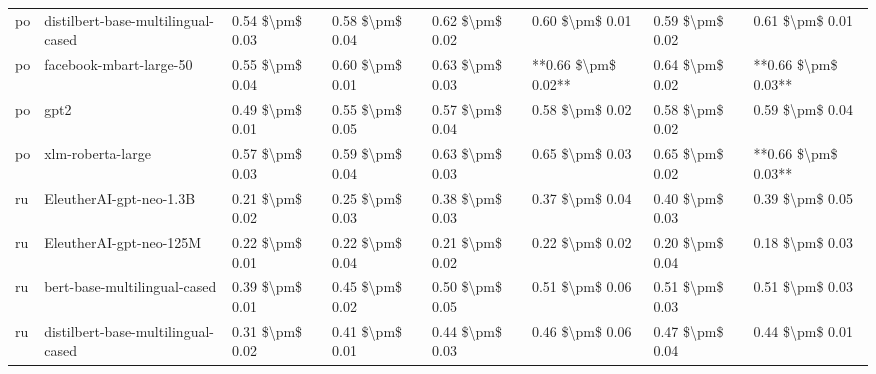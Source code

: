 \begin{tabular}{llllllll}
      po & distilbert-base-multilingual-cased & 0.54 \$\textbackslash pm\$ 0.03 &           0.58 \$\textbackslash pm\$ 0.04 &       0.62 \$\textbackslash pm\$ 0.02 &        0.60 \$\textbackslash pm\$ 0.01 &                         0.59 \$\textbackslash pm\$ 0.02 &     0.61 \$\textbackslash pm\$ 0.01 \\
      po &            facebook-mbart-large-50 & 0.55 \$\textbackslash pm\$ 0.04 &           0.60 \$\textbackslash pm\$ 0.01 &       0.63 \$\textbackslash pm\$ 0.03 &    **0.66 \$\textbackslash pm\$ 0.02** &                         0.64 \$\textbackslash pm\$ 0.02 & **0.66 \$\textbackslash pm\$ 0.03** \\
      po &                               gpt2 & 0.49 \$\textbackslash pm\$ 0.01 &           0.55 \$\textbackslash pm\$ 0.05 &       0.57 \$\textbackslash pm\$ 0.04 &        0.58 \$\textbackslash pm\$ 0.02 &                         0.58 \$\textbackslash pm\$ 0.02 &     0.59 \$\textbackslash pm\$ 0.04 \\
      po &                  xlm-roberta-large & 0.57 \$\textbackslash pm\$ 0.03 &           0.59 \$\textbackslash pm\$ 0.04 &       0.63 \$\textbackslash pm\$ 0.03 &        0.65 \$\textbackslash pm\$ 0.03 &                         0.65 \$\textbackslash pm\$ 0.02 & **0.66 \$\textbackslash pm\$ 0.03** \\
      ru &            EleutherAI-gpt-neo-1.3B & 0.21 \$\textbackslash pm\$ 0.02 &           0.25 \$\textbackslash pm\$ 0.03 &       0.38 \$\textbackslash pm\$ 0.03 &        0.37 \$\textbackslash pm\$ 0.04 &                         0.40 \$\textbackslash pm\$ 0.03 &     0.39 \$\textbackslash pm\$ 0.05 \\
      ru &            EleutherAI-gpt-neo-125M & 0.22 \$\textbackslash pm\$ 0.01 &           0.22 \$\textbackslash pm\$ 0.04 &       0.21 \$\textbackslash pm\$ 0.02 &        0.22 \$\textbackslash pm\$ 0.02 &                         0.20 \$\textbackslash pm\$ 0.04 &     0.18 \$\textbackslash pm\$ 0.03 \\
      ru &       bert-base-multilingual-cased & 0.39 \$\textbackslash pm\$ 0.01 &           0.45 \$\textbackslash pm\$ 0.02 &       0.50 \$\textbackslash pm\$ 0.05 &        0.51 \$\textbackslash pm\$ 0.06 &                         0.51 \$\textbackslash pm\$ 0.03 &     0.51 \$\textbackslash pm\$ 0.03 \\
      ru & distilbert-base-multilingual-cased & 0.31 \$\textbackslash pm\$ 0.02 &           0.41 \$\textbackslash pm\$ 0.01 &       0.44 \$\textbackslash pm\$ 0.03 &        0.46 \$\textbackslash pm\$ 0.06 &                         0.47 \$\textbackslash pm\$ 0.04 &     0.44 \$\textbackslash pm\$ 0.01 \\

\end{tabular}
